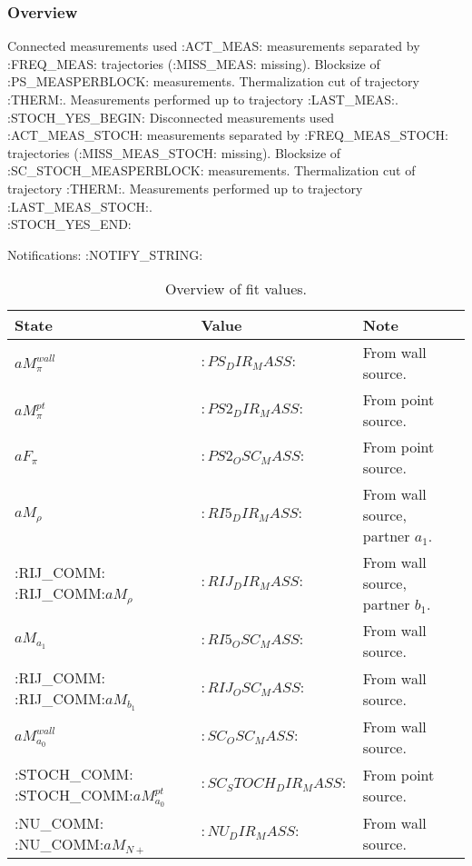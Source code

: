 

\subsubsection{Overview}

Connected measurements used :ACT_MEAS: measurements separated by :FREQ_MEAS: trajectories (:MISS_MEAS: missing). Blocksize of :PS_MEASPERBLOCK: measurements. Thermalization cut of trajectory :THERM:. Measurements performed up to trajectory :LAST_MEAS:. 
~\\

:STOCH_YES_BEGIN:
\noindent Disconnected measurements used :ACT_MEAS_STOCH: measurements separated by :FREQ_MEAS_STOCH: trajectories (:MISS_MEAS_STOCH: missing). Blocksize of :SC_STOCH_MEASPERBLOCK: measurements. Thermalization cut of trajectory :THERM:. Measurements performed up to trajectory :LAST_MEAS_STOCH:.
~\\
:STOCH_YES_END:

\noindent Notifications: :NOTIFY_STRING:

\begin{table}[ht!]
\centering
\begin{tabular}{|l|l|l|}
\hline
 State & Value & Note \\
\hline
 $aM_\pi^{wall}$ & $:PS_DIR_MASS:$ & From wall source. \\
\hline
 $aM_\pi^{pt}$ & $:PS2_DIR_MASS:$ & From point source. \\
\hline
 $aF_\pi$ & $:PS2_OSC_MASS:$ & From point source. \\
\hline
 $aM_{\rho}$ & $:RI5_DIR_MASS:$ & From wall source, partner $a_1$. \\
:RIJ_COMM:\hline
 :RIJ_COMM:$aM_{\rho}$ & $:RIJ_DIR_MASS:$ & From wall source, partner $b_1$.\\
\hline
 $aM_{a_1}$ & $:RI5_OSC_MASS:$ & From wall source. \\
:RIJ_COMM:\hline
 :RIJ_COMM:$aM_{b_1}$ & $:RIJ_OSC_MASS:$ & From wall source.\\
\hline
 $aM_{a_0}^{wall}$ & $:SC_OSC_MASS:$ & From wall source. \\
:STOCH_COMM:\hline
 :STOCH_COMM:$aM_{a_0}^{pt}$ & $:SC_STOCH_DIR_MASS:$ & From point source. \\
:NU_COMM:\hline
 :NU_COMM:$aM_{N+}$ & $:NU_DIR_MASS:$ & From wall source. \\
\hline
\end{tabular}
\caption{Overview of fit values.}
\end{table}

